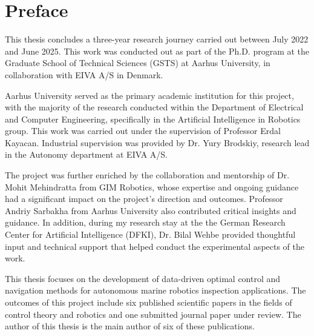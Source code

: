 

\chapter*{Preface}
This thesis concludes a three-year research journey carried out between July 2022 and June 2025. This work was conducted out as part of the Ph.D. program at the Graduate School of Technical Sciences (GSTS) at Aarhus University, in collaboration with EIVA A/S in Denmark. 

Aarhus University served as the primary academic institution for this project, with the majority of the research conducted within the Department of Electrical and Computer Engineering, specifically in the Artificial Intelligence in Robotics group. This work was carried out under the supervision of Professor Erdal Kayacan. Industrial supervision was provided by Dr. Yury Brodskiy, research lead in the Autonomy department at EIVA A/S. 

The project was further enriched by the collaboration and mentorship of Dr. Mohit Mehindratta from GIM Robotics, whose expertise and ongoing guidance had a significant impact on the project's direction and outcomes. Professor Andriy Sarbakha from Aarhus University also contributed critical insights and guidance. In addition, during my research stay at the the German Research Center for Artificial Intelligence (DFKI), Dr. Bilal Wehbe provided thoughtful input and technical support that helped conduct the experimental aspects of the work.

This thesis focuses on the development of data-driven optimal control and navigation methods for autonomous marine robotics inspection applications. The outcomes of this project include six published scientific papers in the fields of control theory and robotics and one submitted journal paper under review. The author of this thesis is the main author of six of these publications.




